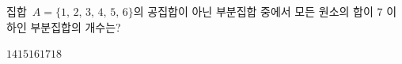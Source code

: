 집합~$A=\{1,\,2,\,3,\,4,\,5,\,6\}$의 공집합이 아닌 부분집합 중에서 모든 원소의 합이 $7$ 이하인 부분집합의 개수는?
\begin{choices32}{$14$}{$15$}{$16$}{$17$}{$18$}\end{choices32}
